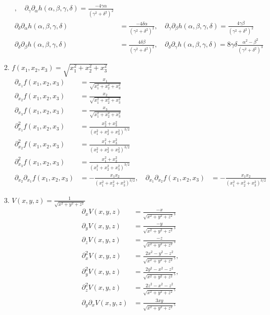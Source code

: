 \documentclass[11pt,answers]{exam}
\begin{document}
\begin{questions}
\begin{solution}
\begin{enumerate}
\begin{align*}
	,\quad
	\partial_\gamma\partial_\alpha h(\alpha,\beta,\gamma,\delta)=\frac{-4\gamma\alpha}{(\gamma^2+\delta^2)^2}
	\\
	\partial_\delta\partial_\alpha h(\alpha,\beta,\gamma,\delta)&=\frac{-4\delta\alpha}{(\gamma^2+\delta^2)^2}
	,\quad
	\partial_\gamma\partial_\beta h(\alpha,\beta,\gamma,\delta)=\frac{4\gamma\beta}{(\gamma^2+\delta^2)^2}
	\\
	\partial_\delta\partial_\beta h(\alpha,\beta,\gamma,\delta)&=\frac{4\delta\beta}{(\gamma^2+\delta^2)^2}
	,\quad
	\partial_\delta\partial_\gamma h(\alpha,\beta,\gamma,\delta)=8\gamma\delta\frac{\alpha^2-\beta^2}{(\gamma^2+\delta^2)^3}
\end{align*}
\item $f(x_1,x_2,x_3)=\sqrt{x_1^2+x_2^2+x_3^2}$
\begin{align*}
\partial_{x_1}f(x_1,x_2,x_3)&=\frac{x_1}{\sqrt{x_1^2+x_2^2+x_3^2}}
\\
\partial_{x_2}f(x_1,x_2,x_3)&=\frac{x_2}{\sqrt{x_1^2+x_2^2+x_3^2}}
\\
\partial_{x_3}f(x_1,x_2,x_3)&=\frac{x_3}{\sqrt{x_1^2+x_2^2+x_3^2}}
\\
\partial_{x_1}^2f(x_1,x_2,x_3)&=\frac{x_2^2+x_3^2}{(x_1^2+x_2^2+x_3^2)^{3/2}}
\\
\partial_{x_2}^2f(x_1,x_2,x_3)&=\frac{x_1^2+x_3^2}{(x_1^2+x_2^2+x_3^2)^{3/2}}
\\ 
\partial_{x_3}^2f(x_1,x_2,x_3)&=\frac{x_1^2+x_2^2}{(x_1^2+x_2^2+x_3^2)^{3/2}}
\\
\partial_{x_2}\partial_{x_1}f(x_1,x_2,x_3)&=-\frac{x_1x_2}{(x_1^2+x_2^2+x_3^2)^{3/2}}
,\quad
\partial_{x_1}\partial_{x_2}f(x_1,x_2,x_3)&=-\frac{x_1x_2}{(x_1^2+x_2^2+x_3^2)^{3/2}}
\end{align*}
\item $V(x,y,z)=\frac{1}{\sqrt{x^2+y^2+z^2}}$
\begin{align*}
	\partial_xV(x,y,z)&=\frac{-x}{\sqrt{x^2+y^2+z^2}^3}
	\\
	\partial_yV(x,y,z)&=\frac{-y}{\sqrt{x^2+y^2+z^2}^3}
	\\
	\partial_zV(x,y,z)&=\frac{-z}{\sqrt{x^2+y^2+z^2}^3}
	\\
	\partial_x^2V(x,y,z)&=\frac{2x^2-y^2-z^2}{\sqrt{x^2+y^2+z^2}^5}, \\ \partial_y^2V(x,y,z)&=\frac{2y^2-x^2-z^2}{\sqrt{x^2+y^2+z^2}^5},\\\partial_z^2V(x,y,z)&=\frac{2z^2-x^2-z^2}{\sqrt{x^2+y^2+z^2}^5}
	\\
	\partial_y\partial_xV(x,y,z)&=\frac{3xy}{\sqrt{x^2+y^2+z^2}^5}

\end{align*}
\end{enumerate}
\end{solution}
\end{questions}
\end{document}
